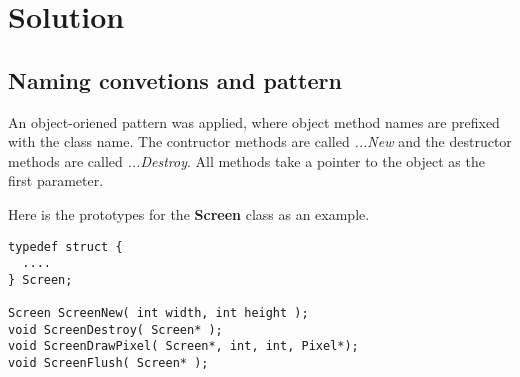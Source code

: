 \section{Solution}

\subsection{Naming convetions and pattern}

An object-oriened pattern was applied, where object method names are prefixed with the class name.
The contructor methods are called {\it ...New} and the destructor methods are called {\it ...Destroy}.
All methods take a pointer to the object as the first parameter.

Here is the prototypes for the {\bf Screen} class as an example.

\begin{lstlisting}
typedef struct {
  ....
} Screen;

Screen ScreenNew( int width, int height );
void ScreenDestroy( Screen* );
void ScreenDrawPixel( Screen*, int, int, Pixel*);
void ScreenFlush( Screen* );
\end{lstlisting}
